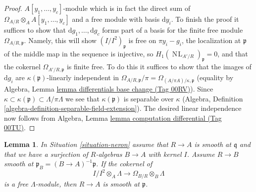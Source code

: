 \documentclass{amsart}
\theoremstyle{plain}
\newtheorem{lemma}[subsection]{Lemma}
\theoremstyle{definition}
\theoremstyle{remark}
\numberwithin{equation}{subsection}
\def\NL{\mathop{N\!L}\nolimits}
\begin{document}
\begin{proof}
$A[y_1, \ldots, y_c]$-module which is in fact the direct sum
of $\Omega_{A/R} \otimes_A A[y_1, \ldots, y_c]$ and a free
module with basis $\text{d}y_i$. To finish the proof it
suffices to show that $\text{d}g_1, \ldots, \text{d}g_c$
forms part of a basis for the finite free module $\Omega_{A/R, \mathfrak p}$.
Namely, this will show $(I/I^2)_\mathfrak p$ is free on $\pi y_i - g_i$,
the localization at $\mathfrak p$ of the middle map in the sequence is
injective, so $H_1(\NL_{A'/R})_\mathfrak p = 0$, and
that the cokernel $\Omega_{A'/R, \mathfrak p}$ is finite free.
To do this it suffices to show
that the images of $\text{d}g_i$ are $\kappa(\mathfrak p)$-linearly
independent in
$\Omega_{A/R, \mathfrak p}/\pi = \Omega_{(A/\pi A)/\kappa, \mathfrak p}$
(equality by Algebra, Lemma \href{https://stacks.math.columbia.edu/tag/00RV}{lemma differentials base change (Tag 00RV)}).
Since $\kappa \subset \kappa(\mathfrak p) \subset \Lambda/\pi \Lambda$
we see that $\kappa(\mathfrak p)$ is separable over $\kappa$
(Algebra, Definition \ref{algebra-definition-separable-field-extension}).
The desired linear independence now follows from
Algebra, Lemma \href{https://stacks.math.columbia.edu/tag/00TU}{lemma computation differential (Tag 00TU)}.
\end{proof}


\begin{lemma}
\label{lemma-neron-when-smooth}
In Situation \ref{situation-neron} assume that $R \to A$ is smooth
at $\mathfrak q$ and that we have a surjection of $R$-algebras
$B \to A$ with kernel $I$. Assume $R \to B$ smooth at
$\mathfrak p_B = (B \to A)^{-1}\mathfrak p$. If the cokernel of
$$
I/I^2 \otimes_A \Lambda \to \Omega_{B/R} \otimes_B \Lambda
$$
is a free $\Lambda$-module, then $R \to A$ is smooth at $\mathfrak p$.
\end{lemma}
\end{document}
